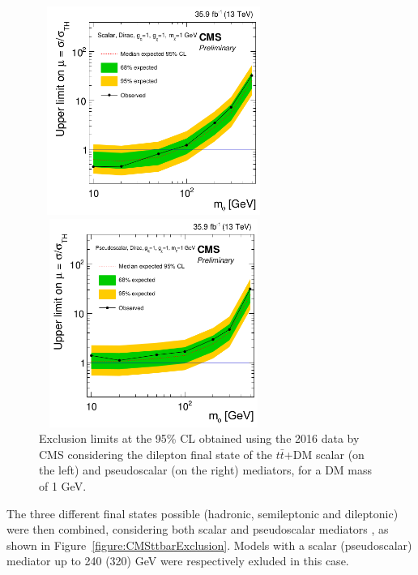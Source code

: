 \documentclass[a4paper, 10pt, openright]{report}
\begin{document}
\begin{figure}[htbp]
\centering
\begin{minipage}[b]{.4\textwidth}
\includegraphics[width=7.5cm, height=6.8cm]{figs/Juan_S.png}
\end{minipage}\hfill
\begin{minipage}[b]{.48\textwidth}
\includegraphics[width=7.5cm, height=6.8cm]{figs/Juan_PS.png}
\end{minipage}\hfill
\caption{Exclusion limits at the 95\% \ac{CL} obtained using the 2016 data by \ac{CMS} considering the dilepton final state of the $t \bar t$+DM scalar (on the left) and pseudoscalar (on the right) mediators, for a \ac{DM} mass of 1 GeV.}
\label{fig:Juan}
\end{figure}

The three different final states possible (hadronic, semileptonic and dileptonic) were then combined, considering both scalar and pseudoscalar mediators \cite{PreviousDoubleTopAllLep13CMS}, as shown in Figure~\ref{figure:CMSttbarExclusion}. Models with a scalar (pseudoscalar) mediator up to 240 (320) GeV were respectively exluded in this case.
\end{document}

